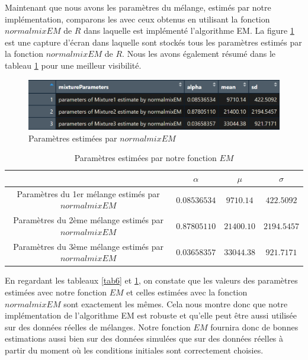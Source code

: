 \documentclass[a4paper,french,10pt]{article}
\begin{document}
\newpage

Maintenant que nous avons les paramètres du mélange, estimés par notre implémentation, comparons les avec ceux obtenus en utilisant la fonction $normalmixEM$ de $R$ dans laquelle est implémenté l'algorithme EM. La figure \ref{paramEstLib} est une capture d'écran dans laquelle sont stockés tous les paramètres estimés par la fonction $normalmixEM$ de $R$. Nous les avons également résumé dans le tableau \ref{tab7} pour une meilleur visibilité.  

\begin{figure}[htp] 
	\centering
	\includegraphics[scale=0.8]{images/paramEstLib.png}
	\caption{Paramètres estimées par $normalmixEM$}
	\label{paramEstLib}
\end{figure}

\begin{table}[htp]
	\center
	\begin{tabular}{|c||c|c|c|}
		\hline
		& $\alpha$ & $\mu$ & $\sigma$\\
		\hline
		Paramètres du 1er mélange estimés par $normalmixEM$ & $0.08536534$ & $9710.14$ & $422.5092$ \\
		\hline
		Paramètres du 2ème mélange estimés par $normalmixEM$ & $0.87805110$ & $21400.10$ & $2194.5457$ \\
		\hline
		Paramètres du 3ème mélange estimés par $normalmixEM$ & $0.03658357$ & $33044.38$ & $921.7171$ \\
		\hline
	\end{tabular}
	\caption{Paramètres estimées par notre fonction $EM$}
	\label{tab7}
\end{table}

En regardant les tableaux \ref{tab6} et \ref{tab7}, on constate que les valeurs des paramètres estimées avec notre fonction $EM$ et celles estimées avec la fonction $normalmixEM$ sont exactement les mêmes. Cela nous montre donc que notre implémentation de l'algorithme EM est robuste et qu'elle peut être aussi utilisée sur des données réelles de mélanges. Notre fonction $EM$ fournira donc de bonnes estimations aussi bien sur des données simulées que sur des données réelles à partir du moment où les conditions initiales sont correctement choisies.
\end{document}

